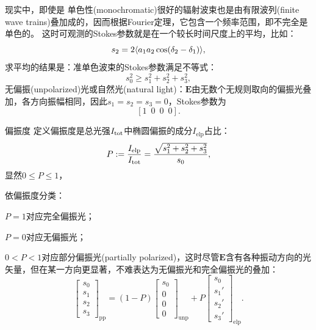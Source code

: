 现实中，即使是%
单色性(monochromatic)很好的辐射波束也是由有限波列(finite wave trains)叠加成的，因而根据Fourier定理，它包含一个频率范围，即不完全是单色的。%
这时可观测的Stokes参数就是在一个较长时间尺度上的平均，比如：
\[
    s_2 = 2\langle a_1a_2\cos(\delta_2 - \delta_1)\rangle,
\]
求平均的结果是：准单色波束的Stokes参数满足不等式：
\begin{equation}
    \label{eq:ed-mixed-stokes-constraint}
    s_0^2 \geqslant s_1^2 + s_2^2 + s_3^2,
\end{equation}
无偏振(unpolarized)光或自然光(natural light)：$\bm E$由无数个无规则取向的偏振光叠加，各方向振幅相同，因此$s_1 = s_2 = s_3 = 0$，Stokes参数为
\[
    [1\enspace0\enspace0\enspace0].
\]

\begin{definition}{偏振度}{}
    定义偏振度是总光强$I_{\mathrm{tot}}$中椭圆偏振的成分$I_\text{elp}$占比：
    \begin{equation}
        \label{eq:ed-degree-of-polarization}
        P := \frac{I_\text{elp}}{I_{\mathrm{tot}}} = \frac{\sqrt{s_1^2 + s_2^2 + s_3^2}}{s_0},
    \end{equation}
    显然$0 \leqslant P \leqslant 1$，
\end{definition}

\begin{corollary}
    依偏振度分类：
    \begin{compactitem}
        \item $P = 1$对应完全偏振光；
        \item $P = 0$对应无偏振光；
        \item $0 < P < 1$对应部分偏振光(partially polarized)，这时尽管$\bm E$含有各种振动方向的光矢量，但在某一方向更显著，不难表达为无偏振光和完全偏振光的叠加：
        \begin{equation}
            \label{eq:ed-stokes-mixture}
            \begin{bmatrix}
                s_0\\s_1\\s_2\\s_3
            \end{bmatrix}_\text{pp} = (1 - P)
            \begin{bmatrix}
                s_0\\0\\0\\0
            \end{bmatrix}_\text{unp} + P
            \begin{bmatrix}
                s_0\\s_1'\\s_2'\\s_3'
            \end{bmatrix}_\text{elp}.
        \end{equation}
    \end{compactitem}
\end{corollary}

